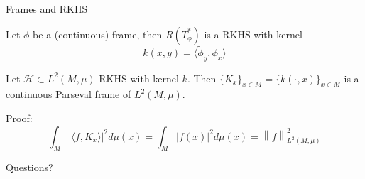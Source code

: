 \documentclass[10pt]{beamer}
\theoremstyle{definition} %
\newcommand{\norm}[1]{\left\lVert#1\right\rVert}
\begin{document}
\begin{frame}{Frames and RKHS}
   \begin{theorem}
    Let $\phi$ be a (continuous) frame, then $R(T^*_\phi)$ is a RKHS with kernel
    $$ k(x,y) = \langle \widetilde\phi_y , \phi_x \rangle$$
   \end{theorem}



\begin{theorem}
    Let $\mathcal{H} \subset L^2(M, \mu)$ RKHS with kernel $k$. Then $\{K_x\}_{x\in M} = \{k(\cdot, x)\}_{x\in M}$ is a continuous Parseval frame of $L^2(M, \mu)$.
\end{theorem}
Proof:
\[
    \int_M |\langle f, K_x \rangle|^2 d\mu(x) = \int_M |f(x)|^2 d\mu(x) = \norm{f}^2_{L^2(M, \mu)}
\]
\end{frame}

\begin{frame}[plain,c]

\begin{center}
\Huge Questions?
\end{center}
\end{frame}
    
\end{document}
